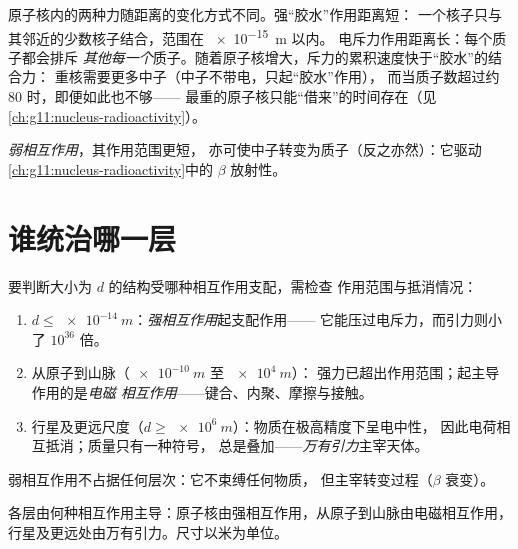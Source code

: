 \begin{remark}\label{rem:g11:fundamental-interactions:nuclei}
原子核内的两种力随距离的变化方式不同。强“胶水”作用距离短：
一个核子只与其邻近的少数核子结合，范围在 \qty{e-15}{m} 以内。
电斥力作用距离长：每个质子都会排斥
\emph{其他每一个}质子。随着原子核增大，斥力的累积速度快于“胶水”的结合力：
重核需要更多中子（中子不带电，只起“胶水”作用），
而当质子数超过约 $80$ 时，即便如此也不够——
最重的原子核只能“借来”的时间存在（见\cref{ch:g11:nucleus-radioactivity}）。
\end{remark}

\begin{definition}[弱相互作用]\label{def:g11:fundamental-interactions:weak}
\emph{弱相互作用}，其作用范围更短，
亦可使中子转变为质子（反之亦然）：它驱动
\cref{ch:g11:nucleus-radioactivity}中的 $\beta$ 放射性。
\end{definition}

\section{谁统治哪一层}

\begin{method}[判断尺度]\label{met:g11:fundamental-interactions:audit}
要判断大小为 $d$ 的结构受哪种相互作用支配，需检查
作用范围与抵消情况：
\begin{enumerate}
  \item $d \leq \qty{e-14}{m}$：\emph{强相互作用}起支配作用——
        它能压过电斥力，而引力则小了 $10^{36}$ 倍。
  \item 从原子到山脉（$\qty{e-10}{m}$ 至 $\qty{e4}{m}$）：
        强力已超出作用范围；起主导作用的是\emph{电磁
        相互作用}——键合、内聚、摩擦与接触。
  \item 行星及更远尺度（$d \geq \qty{e6}{m}$）：物质在极高精度下呈电中性，
        因此电荷相互抵消；质量只有一种符号，
        总是叠加——\emph{万有引力}主宰天体。
\end{enumerate}
弱相互作用不占据任何层次：它不束缚任何物质，
但主宰转变过程（$\beta$ 衰变）。
\end{method}

\begin{omfigure}

{\small 各层由何种相互作用主导：原子核由强相互作用，从原子到山脉由电磁相互作用，
行星及更远处由万有引力。尺寸以米为单位。}
\end{omfigure}

